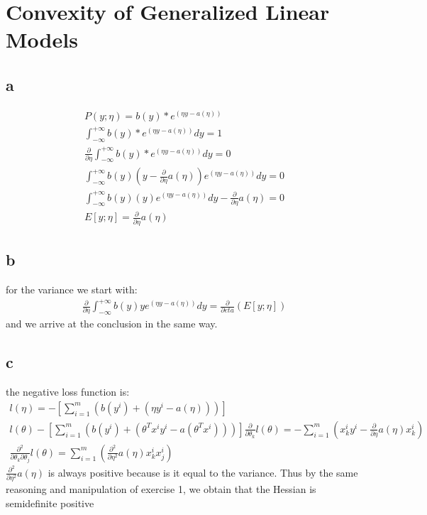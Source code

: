 \documentclass[11pt]{article}
\begin{document}
\section{Convexity of Generalized Linear Models}
\subsection{a}
\begin{gather*}
    P(y;\eta) = b(y)*e^{(\eta y-a(\eta))}\\
    \int_{-\infty}^{+\infty}b(y)*e^{(\eta y-a(\eta))}dy = 1\\
    \frac{\partial}{\partial\eta}\int_{-\infty}^{+\infty}b(y)*e^{(\eta y-a(\eta))}dy = 0\\
    \int_{-\infty}^{+\infty}b(y)(y-\frac{\partial}{\partial \eta}a(\eta))e^{(\eta y-a(\eta))}dy = 0\\
    \int_{-\infty}^{+\infty}b(y)(y)e^{(\eta y-a(\eta))}dy-\frac{\partial}{\partial \eta}a(\eta) = 0\\
    E[y;\eta] = \frac{\partial}{\partial \eta}a(\eta)
\end{gather*}
\subsection{b}
for the variance we start with:
\begin{gather}
    \frac{\partial}{\partial\eta}\int_{-\infty}^{+\infty}b(y)ye^{(\eta y-a(\eta))}dy = \frac{\partial}{\partial eta}(E[y;\eta])
\end{gather}
and we arrive at the conclusion in the same way.
\subsection{c}
the negative loss function is:
\begin{gather*}
    l(\eta)= -[\sum_{i=1}^{m}(b(y^{i})+(\eta y^{i}-a(\eta)))]\\
    l(\theta)-[\sum_{i=1}^{m}(b(y^{i})+(\theta^{T}x^{i} y^{i}-a(\theta^{T}x^{i})))]
    \frac{\partial }{\partial \theta_k}l(\theta) = -\sum_{i=1}^{m}(x^{i}_{k} y^{i}-\frac{\partial }{\partial \eta}a(\eta)x^{i}_{k})\\
    \frac{\partial^{2} }{\partial \theta_k \partial \theta_j}l(\theta) = \sum_{i=1}^{m}(\frac{\partial^{2} }{\partial \eta^{2}}a(\eta)x^{i}_{k}x^{i}_j)
\end{gather*}
$\frac{\partial^{2} }{\partial \eta^{2}}a(\eta)$ is always positive because is it equal to the variance. Thus by the same reasoning and manipulation of exercise 1, we obtain that the Hessian is semidefinite positive
\end{document}
